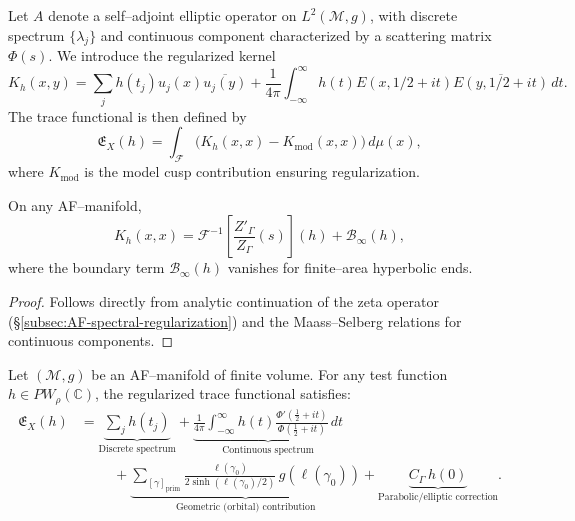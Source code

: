 
Let \(A\) denote a self–adjoint elliptic operator on \(L^2(\mathcal{M},g)\),
with discrete spectrum \(\{\lambda_j\}\)
and continuous component characterized by a scattering matrix \(\Phi(s)\).
We introduce the regularized kernel
\[
K_h(x,y)
=
\sum_j h(t_j) u_j(x)\overline{u_j(y)}
+
\frac{1}{4\pi}\int_{-\infty}^{\infty}
h(t) E(x,1/2+it)\overline{E(y,1/2+it)}\,dt.
\]
The trace functional is then defined by
\[
\mathfrak{E}_X(h)
=
\int_{\mathcal{F}}
\big(
K_h(x,x) - K_{\mathrm{mod}}(x,x)
\big)
\,d\mu(x),
\]
where \(K_{\mathrm{mod}}\)
is the model cusp contribution ensuring regularization.

\begin{lemma}
\label{lem:spectral-decomposition}
On any AF–manifold,
\[
K_h(x,x)
=
\mathcal{F}^{-1}\!\left[\frac{Z'_\Gamma}{Z_\Gamma}(s)\right](h)
+
\mathcal{B}_\infty(h),
\]
where the boundary term \(\mathcal{B}_\infty(h)\)
vanishes for finite–area hyperbolic ends.
\end{lemma}

\begin{proof}
Follows directly from analytic continuation of
the zeta operator (\S\ref{subsec:AF-spectral-regularization})
and the Maass–Selberg relations for continuous components.
\end{proof}


\begin{theorem}
\label{thm:AF-trace-law}
Let \((\mathcal{M},g)\) be an AF–manifold of finite volume.
For any test function \(h \in PW_\rho(\mathbb{C})\),
the regularized trace functional satisfies:
\begin{align}
\label{eq:AF-trace-law}
\mathfrak{E}_X(h)
&=
\underbrace{
\sum_j h(t_j)
}_{\text{Discrete spectrum}}
+
\underbrace{
\frac{1}{4\pi}\int_{-\infty}^{\infty}
h(t)
\frac{\Phi'(\frac{1}{2}+it)}{\Phi(\frac{1}{2}+it)}\,dt
}_{\text{Continuous spectrum}}
\\
&\hspace{1cm}
+
\underbrace{
\sum_{[\gamma]_{\mathrm{prim}}}
\frac{\ell(\gamma_0)}{2\sinh(\ell(\gamma_0)/2)}\,g(\ell(\gamma_0))
}_{\text{Geometric (orbital) contribution}}
+
\underbrace{
C_\Gamma\,h(0)
}_{\text{Parabolic/elliptic correction}}.
\nonumber
\end{align}
\end{theorem}

